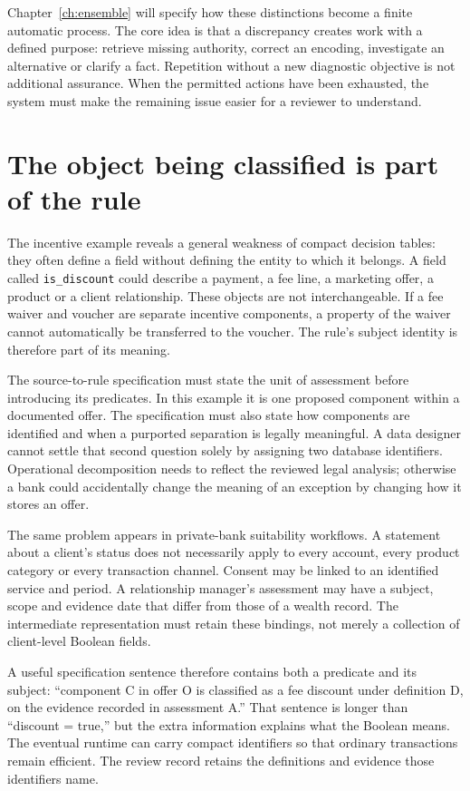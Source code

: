 Chapter~\ref{ch:ensemble} will specify how these distinctions become a finite
automatic process. The core idea is that a discrepancy creates work with a
defined purpose: retrieve missing authority, correct an encoding, investigate an
alternative or clarify a fact. Repetition without a new diagnostic objective is
not additional assurance. When the permitted actions have been exhausted, the
system must make the remaining issue easier for a reviewer to understand.

\section{The object being classified is part of the rule}
\label{merge:M01:05}

\label{sec:problem-objects}
The incentive example reveals a general weakness of compact decision tables:
they often define a field without defining the entity to which it belongs. A
field called \texttt{is\_discount} could describe a payment, a fee line, a
marketing offer, a product or a client relationship. These objects are not
interchangeable. If a fee waiver and voucher are separate incentive components,
a property of the waiver cannot automatically be transferred to the voucher.
The rule's subject identity is therefore part of its meaning.

The source-to-rule specification must state the unit of assessment before
introducing its predicates. In this example it is one proposed component within
a documented offer. The specification must also state how components are
identified and when a purported separation is legally meaningful. A data
designer cannot settle that second question solely by assigning two database
identifiers. Operational decomposition needs to reflect the reviewed legal
analysis; otherwise a bank could accidentally change the meaning of an exception
by changing how it stores an offer.

The same problem appears in private-bank suitability workflows. A statement
about a client's status does not necessarily apply to every account, every
product category or every transaction channel. Consent may be linked to an
identified service and period. A relationship manager's assessment may have a
subject, scope and evidence date that differ from those of a wealth record.
The intermediate representation must retain these bindings, not merely a
collection of client-level Boolean fields.

A useful specification sentence therefore contains both a predicate and its
subject: ``component C in offer O is classified as a fee discount under
definition D, on the evidence recorded in assessment A.'' That sentence is longer
than ``discount = true,'' but the extra information explains what the Boolean
means. The eventual runtime can carry compact identifiers so that ordinary
transactions remain efficient. The review record retains the definitions and
evidence those identifiers name.

